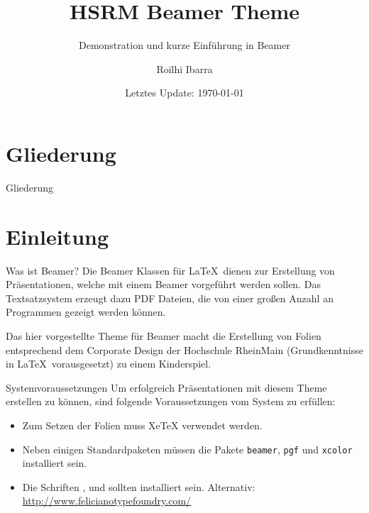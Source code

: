 \documentclass[compress]{beamer}
\title{HSRM Beamer Theme}
\subtitle{Demonstration und kurze Einführung in Beamer}
\date{Letztes Update: \today}
\author{Roilhi Ibarra}
\institute{Studienbereich Informations- und Elektrotechnik\\Hochschule {\Medium RheinMain}}
\begin{document}


\begin{frame}[plain]
	\titlepage
\end{frame}

\section*{Gliederung}
\begin{frame}{Gliederung}
	\tableofcontents[hideallsubsections]
\end{frame}

\section{Einleitung}

\begin{frame}{Was ist Beamer?}
	Die Beamer Klassen für \LaTeX\ dienen zur Erstellung von Präsentationen, welche mit einem Beamer vorgeführt werden sollen. Das Textsatzsystem erzeugt dazu PDF Dateien, die von einer großen Anzahl an Programmen gezeigt werden können.
	
	Das hier vorgestellte Theme für Beamer macht die Erstellung von Folien entsprechend dem Corporate Design der Hochschule {\Medium RheinMain} (Grundkenntnisse in \LaTeX\ vorausgesetzt) zu einem Kinderspiel.
\end{frame}

\begin{frame}{Systemvoraussetzungen}
	Um erfolgreich Präsentationen mit diesem Theme erstellen zu können, sind folgende Voraussetzungen vom System zu erfüllen:
	\begin{itemize}
		\item Zum Setzen der Folien muss XeTeX verwendet werden.
		\item Neben einigen Standardpaketen müssen die Pakete \texttt{beamer}, \texttt{pgf} und \texttt{xcolor} installiert sein.
		\item Die Schriften ,  und  sollten installiert sein. Alternativ: \\\url{http://www.felicianotypefoundry.com/}
	\end{itemize}
\end{frame}
\end{document}
